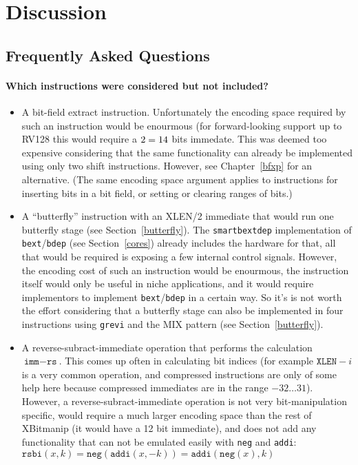 \chapter{Discussion}

\section{Frequently Asked Questions}

\subsubsection{Which instructions were considered but not included?}

\begin{itemize}
\item A bit-field extract instruction. Unfortunately the encoding space required
by such an instruction would be enourmous (for forward-looking support up to
RV128 this would require a $2 \time 7 = 14$ bits immedate. This was deemed
too expensive considering that the same functionality can already be implemented
using only two shift instructions. However, see Chapter~\ref{bfxp} for an
alternative. (The same encoding space argument applies to instructions for
inserting bits in a bit field, or setting or clearing ranges of bits.)

\item A ``butterfly'' instruction with an XLEN/2 immediate that would run one
butterfly stage (see Section~\ref{butterfly}). The {\tt smartbextdep} implementation
of {\tt bext}/{\tt bdep} (see Section~\ref{cores}) already includes the hardware
for that, all that would be required is exposing a few internal control signals.
However, the encoding cost of such an instruction would be enourmous, the
instruction itself would only be useful in niche applications, and it would require
implementors to implement {\tt bext}/{\tt bdep} in a certain way. So it's is
not worth the effort considering that a butterfly stage can also be implemented in
four instructions using {\tt grevi} and the MIX pattern (see Section~\ref{butterfly}).

\item A reverse-subract-immediate operation that performs the calculation
$\texttt{imm} - \texttt{rs}$.  This comes up often in calculating bit indices
(for example $\texttt{XLEN} - i$ is a very common operation, and compressed
instructions are only of some help here because compressed immediates are in
the range $-32 \dots 31$). However, a reverse-subract-immediate operation is
not very bit-manipulation specific, would require a much larger encoding
space than the rest of XBitmanip (it would have a 12 bit immediate), and
does not add any functionality that can not be emulated easily with {\tt neg} and
{\tt addi}: $\texttt{rsbi}(x, k) = \texttt{neg}(\texttt{addi}(x, -k)) = \texttt{addi}(\texttt{neg}(x), k)$


\end{itemize}
